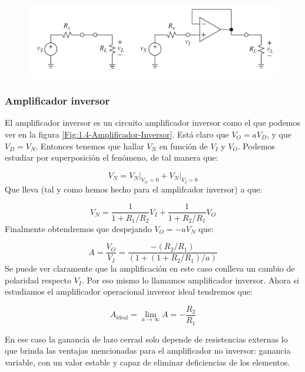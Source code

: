 \documentclass[12pt,a4paper]{article}
\numberwithin{equation}{section}
\numberwithin{figure}{section}
\begin{document}
\begin{figure}[t] \centering
\includegraphics[scale=0.4]{1.3-Buffer-1.png}
\caption{}
\label{Fig:1.3-Buffer-1}
\end{figure} 


\subsubsection{Amplificador inversor}



El amplificador inversor es un circuito amplificador inversor como el que podemos ver en la figura \ref{Fig:1.4-Amplificador-Inversor}. Está claro que $V_O = a V_D$, y que $V_D = V_N$. Entonces tenemos que hallar $V_N$ en función de $V_I$ y $V_O$. Podemos estudiar por superposición el fenómeno, de tal manera que:

\begin{equation}
V_N = \left. V_N \right|_{V_O=0} +   \left. V_N \right|_{V_I=0}
\end{equation}
Que lleva (tal y como hemos hecho para el amplifcador inversor) a que:

\begin{equation}
V_N = \dfrac{1}{1+R_1/R_2} V_I + \dfrac{1}{1+R_2/R_1} V_O 
\end{equation}
Finalmente obtendremos que despejando $V_O = -  a V_N$ que:

\begin{equation}
A = \dfrac{V_O}{V_I} = \dfrac{-(R_2/R_1)}{(1+(1+R_2/R_1)/a)}
\end{equation}
Se puede ver claramente que la amplificación en este caso conlleva un cambio de polaridad  respecto $V_I$. Por eso mismo lo llamamos amplificador inversor. Ahora si estudiamos el amplificador operacional inversor ideal tendremos que:

\begin{equation}
A_{\mathrm{ideal}} = \lim_{a \rightarrow \infty} A = - \dfrac{R_2}{R_1}
\end{equation}

En ese caso la ganancia de lazo cerrad solo depende de resistencias externas lo que brinda las ventajas mencionadas para el amplificador no inversor: ganancia variable, con un valor estable y capaz de eliminar deficiencias de los elementos.  \\
\end{document}
